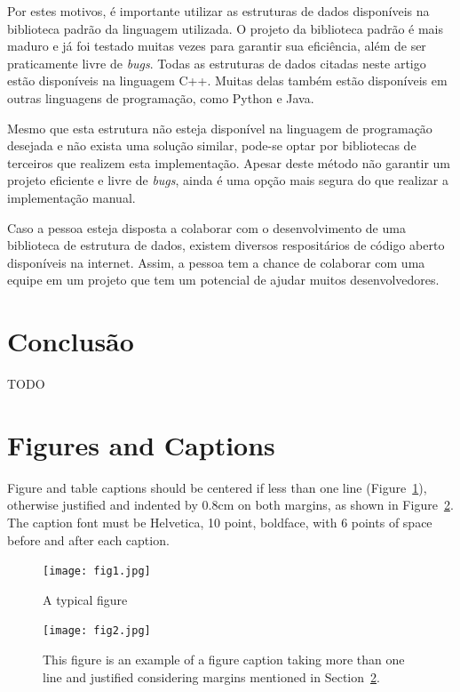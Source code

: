\documentclass[12pt]{article}
\begin{document}
Por estes motivos, \'{e} importante utilizar as estruturas de dados dispon\'{i}veis na biblioteca padr\~{a}o da linguagem
utilizada. O projeto da biblioteca padr\~{a}o \'{e} mais maduro e j\'{a} foi testado muitas vezes para garantir sua
efici\^{e}ncia, al\'{e}m de ser praticamente livre de \textit{bugs}. Todas as estruturas de dados citadas neste artigo
est\~{a}o dispon\'{i}veis na linguagem C++. Muitas delas tamb\'{e}m est\~{a}o dispon\'{i}veis em outras linguagens de
programa\c{c}\~{a}o, como Python e Java.

Mesmo que esta estrutura n\~{a}o esteja dispon\'{i}vel na linguagem de programa\c{c}\~{a}o desejada e n\~{a}o exista
uma solu\c{c}\~{a}o similar, pode-se optar por bibliotecas de terceiros que realizem esta implementa\c{c}\~{a}o. Apesar deste
m\'{e}todo n\~{a}o garantir um projeto eficiente e livre de \textit{bugs}, ainda \'{e} uma op\c{c}\~{a}o mais segura
do que realizar a implementa\c{c}\~{a}o manual.

Caso a pessoa esteja disposta a colaborar com o desenvolvimento de uma biblioteca de estrutura de dados, existem
diversos resposit\'{a}rios de c\'{o}digo aberto dispon\'{i}veis na internet. Assim, a pessoa tem a chance de
colaborar com uma equipe em um projeto que tem um potencial de ajudar muitos desenvolvedores.

\section{Conclus\~{a}o}

TODO

\section{Figures and Captions}\label{sec:figs}


Figure and table captions should be centered if less than one line
(Figure~\ref{fig:exampleFig1}), otherwise justified and indented by 0.8cm on
both margins, as shown in Figure~\ref{fig:exampleFig2}. The caption font must
be Helvetica, 10 point, boldface, with 6 points of space before and after each
caption.

\begin{figure}[ht]
\centering
\texttt{[image: fig1.jpg]}
\caption{A typical figure}
\label{fig:exampleFig1}
\end{figure}

\begin{figure}[ht]
\centering
\texttt{[image: fig2.jpg]}
\caption{This figure is an example of a figure caption taking more than one
  line and justified considering margins mentioned in Section~\ref{sec:figs}.}
\label{fig:exampleFig2}
\end{figure}
\end{document}
